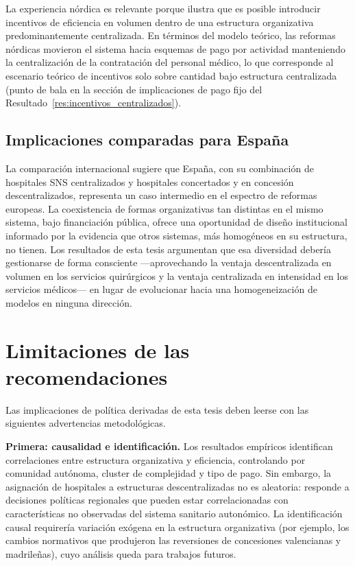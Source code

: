 La experiencia nórdica es relevante porque ilustra que es posible introducir incentivos de eficiencia en volumen dentro de una estructura organizativa predominantemente centralizada. En términos del modelo teórico, las reformas nórdicas movieron el sistema hacia esquemas de pago por actividad manteniendo la centralización de la contratación del personal médico, lo que corresponde al escenario teórico de incentivos solo sobre cantidad bajo estructura centralizada (punto de bala en la sección de implicaciones de pago fijo del Resultado~\ref{res:incentivos_centralizados}).

\subsection{Implicaciones comparadas para España}

La comparación internacional sugiere que España, con su combinación de hospitales SNS centralizados y hospitales concertados y en concesión descentralizados, representa un caso intermedio en el espectro de reformas europeas. La coexistencia de formas organizativas tan distintas en el mismo sistema, bajo financiación pública, ofrece una oportunidad de diseño institucional informado por la evidencia que otros sistemas, más homogéneos en su estructura, no tienen. Los resultados de esta tesis argumentan que esa diversidad debería gestionarse de forma consciente ---aprovechando la ventaja descentralizada en volumen en los servicios quirúrgicos y la ventaja centralizada en intensidad en los servicios médicos--- en lugar de evolucionar hacia una homogeneización de modelos en ninguna dirección.

\section{Limitaciones de las recomendaciones}
\label{sec:limitaciones_recomendaciones}

Las implicaciones de política derivadas de esta tesis deben leerse con las siguientes advertencias metodológicas.

\textbf{Primera: causalidad e identificación.} Los resultados empíricos identifican correlaciones entre estructura organizativa y eficiencia, controlando por comunidad autónoma, cluster de complejidad y tipo de pago. Sin embargo, la asignación de hospitales a estructuras descentralizadas no es aleatoria: responde a decisiones políticas regionales que pueden estar correlacionadas con características no observadas del sistema sanitario autonómico. La identificación causal requirería variación exógena en la estructura organizativa (por ejemplo, los cambios normativos que produjeron las reversiones de concesiones valencianas y madrileñas), cuyo análisis queda para trabajos futuros.

